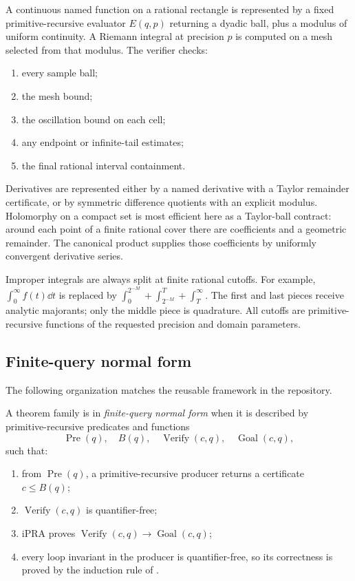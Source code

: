 A continuous named function on a rational rectangle is represented by a fixed
primitive-recursive evaluator
\(E(q,p)\) returning a dyadic ball, plus a modulus of uniform continuity.
A Riemann integral at precision \(p\) is computed on a mesh selected from that
modulus.  The verifier checks:

\begin{enumerate}
\item every sample ball;
\item the mesh bound;
\item the oscillation bound on each cell;
\item any endpoint or infinite-tail estimates;
\item the final rational interval containment.
\end{enumerate}

Derivatives are represented either by a named derivative with a Taylor
remainder certificate, or by symmetric difference quotients with an explicit
modulus.  Holomorphy on a compact set is most efficient here as a Taylor-ball
contract: around each point of a finite rational cover there are coefficients
and a geometric remainder.  The canonical product supplies those coefficients
by uniformly convergent derivative series.

Improper integrals are always split at finite rational cutoffs.  For example,
\(
\int_0^\infty f(t)\dd t
\)
is replaced by
\(
\int_0^{2^{-M}}+\int_{2^{-M}}^T+\int_T^\infty
\).
The first and last pieces receive analytic majorants; only the middle piece is
quadrature.  All cutoffs are primitive-recursive functions of the requested
precision and domain parameters.

\subsection{Finite-query normal form}

The following organization matches the reusable framework in the repository.

\begin{definition}
A theorem family is in \emph{finite-query normal form} when it is described by
primitive-recursive predicates and functions
\[
 \operatorname{Pre}(q),\quad B(q),\quad
 \operatorname{Verify}(c,q),\quad \operatorname{Goal}(c,q),
\]
such that:
\begin{enumerate}
\item from \(\operatorname{Pre}(q)\), a primitive-recursive producer returns a
certificate \(c\le B(q)\);
\item \(\operatorname{Verify}(c,q)\) is quantifier-free;
\item iPRA proves
\(\operatorname{Verify}(c,q)\to\operatorname{Goal}(c,q)\);
\item every loop invariant in the producer is quantifier-free, so its
correctness is proved by the induction rule of .
\end{enumerate}
\end{definition}

